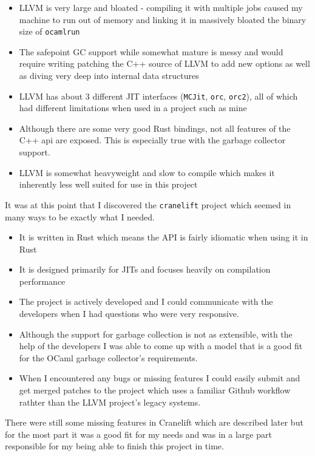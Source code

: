\begin{itemize}
    \item LLVM is very large and bloated - compiling it with multiple jobs caused my machine to run
          out of memory and linking it in massively bloated the binary size of \texttt{ocamlrun}
    \item The safepoint GC support while somewhat mature is messy and would require writing
          patching the C++ source of LLVM to add new options as well as diving very deep into
          internal data
          structures
    \item LLVM has about 3 different JIT interfaces (\texttt{MCJit}, \texttt{orc}, \texttt{orc2}),
          all of which had different limitations when used in a project such as mine
    \item Although there are some very good Rust bindings, not all features of the C++ api are
          exposed. This is especially true with the garbage collector support.
    \item LLVM is somewhat heavyweight and slow to compile which makes it inherently less well
          suited for use in this project
\end{itemize}

It was at this point that I discovered the \texttt{cranelift} project which seemed in many ways to
be exactly what I needed.

\begin{itemize}
    \item It is written in Rust which means the API is fairly idiomatic when using it in Rust
    \item It is designed primarily for JITs and focuses heavily on compilation performance
    \item The project is actively developed and I could communicate with the developers when I had
          questions who were very responsive.
    \item Although the support for garbage collection is not as extensible, with the help of the
          developers I was able to come up with a model that is a good fit for the OCaml garbage
          collector's
          requirements.
    \item When I encountered any bugs or missing features I could easily submit and get merged
          patches to the project which uses a familiar Github workflow rathter than the LLVM
          project's legacy
          systems.
\end{itemize}

There were still some missing features in Cranelift which are described later but for the most
part it was a good fit for my needs and was in a large part responsible for my being able to
finish this project in time.


